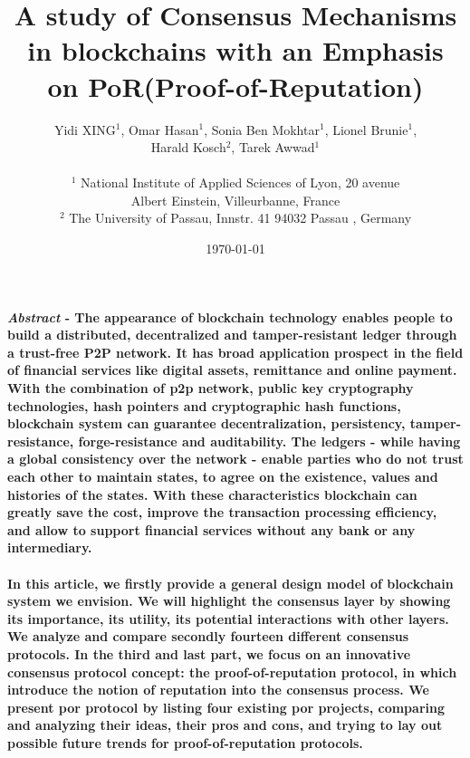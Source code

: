 \documentclass[]{article}
\begin{document}
\begin{CJK*}{UTF8}{gbsn}

\date{\today}
\author{Yidi XING$^1$, Omar Hasan$^1$, Sonia Ben Mokhtar$^1$, Lionel Brunie$^1$,\\ Harald Kosch$^2$, Tarek Awwad$^1$
\\\\$^1$ National Institute of Applied Sciences of Lyon,   20 avenue \\Albert Einstein, Villeurbanne, France
\\$^2$ The University of Passau, Innstr. 41 94032 Passau , Germany}
\title{A study of Consensus Mechanisms in blockchains with an Emphasis on PoR(Proof-of-Reputation)}
\maketitle

\paragraph{      \textit{Abstract} - The appearance of blockchain technology enables people to build a distributed, decentralized and tamper-resistant ledger through a trust-free P2P network. It has broad application prospect in the field of financial services like digital assets, remittance and online payment. With the combination of p2p network, public key cryptography technologies, hash pointers and cryptographic hash functions, blockchain system can guarantee decentralization, persistency, tamper-resistance, forge-resistance and auditability. The ledgers - while having a  global consistency over the network - enable parties who do not trust each other to maintain states, to agree on the existence, values and histories of the states. With these characteristics blockchain can greatly save the cost, improve the transaction processing efficiency, and allow to support financial services without any bank or any intermediary.}    
 
\paragraph{     In this article, we firstly provide a general design model of blockchain system we envision.  We will highlight the consensus layer by showing its importance, its utility, its potential interactions with other layers. We analyze and compare secondly fourteen different consensus protocols. In the third and last part, we focus on an innovative consensus protocol concept: the proof-of-reputation protocol, in which introduce the notion of reputation into the consensus process. We present por protocol by listing four existing por projects, comparing and analyzing their ideas, their pros and cons, and trying to lay out possible future trends for proof-of-reputation protocols. }


\end{CJK*}
\end{document}
